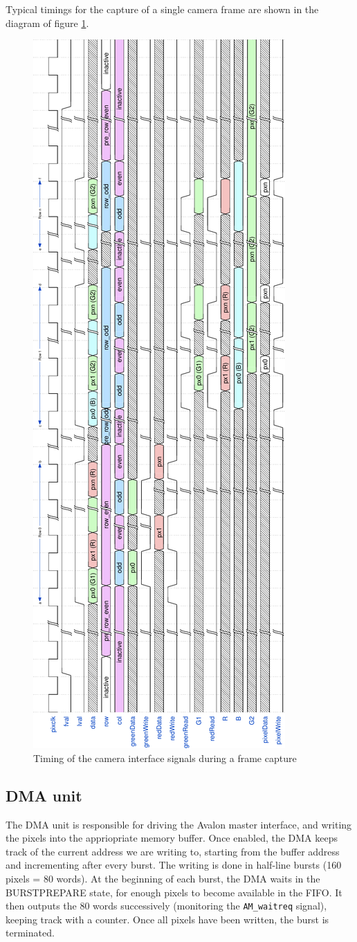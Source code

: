 \documentclass[12pt,a4paper]{article}
\begin{document}
Typical timings for the capture of a single camera frame are shown in the diagram of figure \ref{fig:camtime}.

\begin{figure}[p]
	\centering
	\includegraphics[width=.51\textwidth]{figures/camera_timings_rot}
	\caption{Timing of the camera interface signals during a frame capture}
	\label{fig:camtime}
\end{figure}


\newpage
\subsection{DMA unit}

The DMA unit is responsible for driving the Avalon master interface, and writing the pixels into the appriopriate memory buffer. Once enabled, the DMA keeps track of the current address we are writing to, starting from the buffer address and incrementing after every burst. The writing is done in half-line bursts (160 pixels = 80 words). At the beginning of each burst, the DMA waits in the BURSTPREPARE state, for enough pixels to become available in the FIFO. It then outputs the 80 words successively (monitoring the \texttt{AM\_waitreq} signal), keeping track with a counter. Once all pixels have been written, the burst is terminated.
\end{document}
